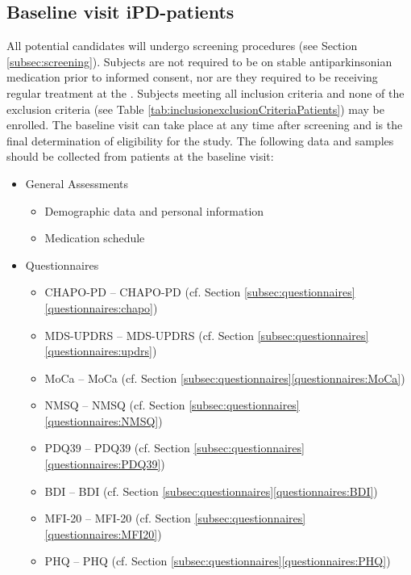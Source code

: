 \subsection{Baseline visit \ac{iPD}-patients}
All potential candidates will undergo screening procedures (see Section \ref{subsec:screening}). Subjects are not required to be on stable antiparkinsonian medication prior to informed consent, nor are they required to be receiving regular treatment at the \UKM. Subjects meeting all inclusion criteria and none of the exclusion criteria (see Table \ref{tab:inclusionexclusionCriteriaPatients}) may be enrolled. The baseline visit can take place at any time after screening and is the final determination of eligibility for the study. The following data and samples should be collected from patients at the baseline visit:
\begin{itemize}[noitemsep,topsep=0pt]
\item General Assessments
\begin{itemize}[noitemsep,topsep=0pt]
\item Demographic data and personal information
\item Medication schedule
\end{itemize}
\item Questionnaires
\begin{itemize}[noitemsep,topsep=0pt]
\item \acl{CHAPO-PD} -- \acs{CHAPO-PD} (cf. Section \ref{subsec:questionnaires}\ref{questionnaires:chapo})
\item \acl{MDS-UPDRS} -- \acs{MDS-UPDRS} (cf. Section \ref{subsec:questionnaires}\ref{questionnaires:updrs})
\item \acl{MoCa} -- \acs{MoCa} (cf. Section \ref{subsec:questionnaires}\ref{questionnaires:MoCa})
\item \acl{NMSQ} -- \acs{NMSQ} (cf. Section \ref{subsec:questionnaires}\ref{questionnaires:NMSQ})
\item \acl{PDQ39} -- \acs{PDQ39} (cf. Section \ref{subsec:questionnaires}\ref{questionnaires:PDQ39})
\item \acl{BDI} -- \acs{BDI} (cf. Section \ref{subsec:questionnaires}\ref{questionnaires:BDI})
\item \acl{MFI-20} -- \acs{MFI-20} (cf. Section \ref{subsec:questionnaires}\ref{questionnaires:MFI20})
\item \acl{PHQ} -- \acs{PHQ} (cf. Section \ref{subsec:questionnaires}\ref{questionnaires:PHQ})

\end{itemize}
\end{itemize}
